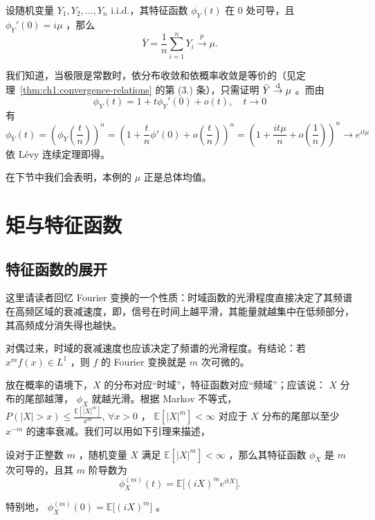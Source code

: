 \begin{example}[弱大数律]
设随机变量 $Y_1,Y_2,\dots,Y_n$ i.i.d.，其特征函数 $\phi_Y(t)$ 在 0 处可导，且 $\phi_Y'(0)=i\mu$ ，那么
\[
\bar Y=\frac1n\sum_{i=1}^nY_i\overset{p}\to \mu.
\]

我们知道，当极限是常数时，依分布收敛和依概率收敛是等价的（见定理~\ref{thm:ch1:convergence-relations} 的第 (3.) 条），只需证明 $\bar Y\overset{\rm d}\to \mu$ 。而由\[\phi_Y(t) = 1 + t\phi_Y'(0) + o(t), \quad t \to 0\]
有\[\phi_{\bar{Y}}(t) = \left(\phi_Y\!\left(\frac{t}{n}\right)\right)^n = \left(1 + \frac{t}{n}\phi'(0) + o\!\left(\frac{t}{n}\right)\right)^n = \left(1 + \frac{i t \mu}{n} + o\!\left(\frac{1}{n}\right)\right)^n \to e^{i t \mu}\]
依 Lévy 连续定理即得。


在下节中我们会表明，本例的 $\mu$ 正是总体均值。

\end{example}

\section{矩与特征函数}

\subsection{特征函数的展开}

这里请读者回忆 Fourier 变换的一个性质：时域函数的光滑程度直接决定了其频谱在高频区域的衰减速度，即，信号在时间上越平滑，其能量就越集中在低频部分，其高频成分消失得也越快。%

对偶过来，时域的衰减速度也应该决定了频谱的光滑程度。有结论：若 $x^m f(x)\in L^1$ ，则 $f$ 的 Fourier 变换就是 $m$ 次可微的。

放在概率的语境下，$X$ 的分布对应``时域''，特征函数对应``频域''；应该说： $X$ 分布的尾部越薄， $\phi_X$ 就越光滑。根据 Markov 不等式， $P(|X|>x)\le \frac{\mathbb{E}[|X|^m]}{x^m},\,\forall x>0$ ， $\mathbb{E}[|X|^m]<\infty$ 对应于 $X$ 分布的尾部以至少 $x^{-m}$ 的速率衰减。我们可以用如下引理来描述，

\begin{lemma*}

设对于正整数 $m$ ，随机变量 $X$ 满足 $\mathbb{E}[|X|^m]<\infty$ ，那么其特征函数 $\phi_X$ 是 $m$ 次可导的，且其 $m$ 阶导数为
\[
\phi_X^{(m)}(t)=\mathbb{E}\big[(iX)^me^{itX}\big].
\]

特别地， $\phi_X^{(m)}(0)=\mathbb{E}\big[(iX)^m\big]$ 。

\end{lemma*}

